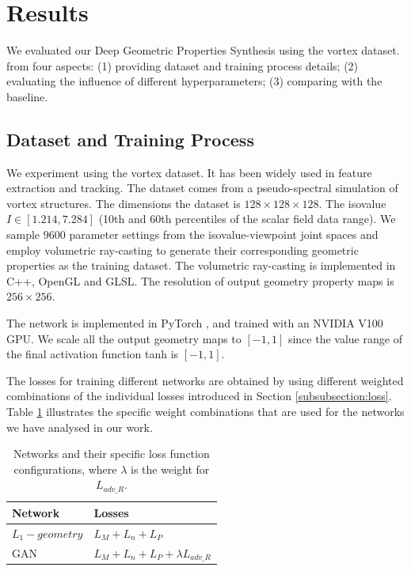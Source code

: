 \documentclass[journal]{vgtc}                %
\begin{document}
\section{Results}
We evaluated our Deep Geometric Properties Synthesis using the vortex dataset. from four aspects: (1) providing dataset and training process details; (2) evaluating the influence of different hyperparameters;  (3) comparing with the baseline.

\subsection{Dataset and Training Process}
We experiment using the vortex dataset. It has been widely used in feature extraction and tracking. The dataset comes from a pseudo-spectral simulation of vortex structures. The dimensions the dataset is $128 \times 128 \times 128$. The isovalue $I \in [1.214, 7.284]$ (10th and 60th percentiles of the scalar field data range). We sample $9600$ parameter settings from the isovalue-viewpoint joint spaces and employ volumetric ray-casting to generate their corresponding geometric properties as the training dataset. The volumetric ray-casting is implemented in C++, OpenGL and GLSL. The resolution of output geometry property maps is $256 \times 256$.   

The network is implemented in PyTorch \cite{paszke2019pytorch}, and trained with an NVIDIA V100 GPU. We scale all the output geometry maps to $[-1, 1]$ since the value range of the final activation function tanh is $[-1, 1]$.   

The losses for training different networks are obtained by using different weighted combinations of the individual losses introduced in Section \ref{subsubsection:loss}. Table \ref{table:loss} illustrates the specific weight combinations that are used for the networks we have analysed in our work.  

\begin{table}
\caption{Networks and their specific loss function configurations, where $\lambda$ is the weight for $L_{adv\_R}$.}
    \centering
    \begin{tabular}{l|l}
        Network & Losses \\  \hline
        $L_1-geometry$ & $L_M + L_n + L_P$  \\ \hline
        GAN & $L_M + L_n + L_P + \lambda L_{adv\_R}$ \\ 
    \end{tabular}
    \label{table:loss}
\end{table}
\end{document}
